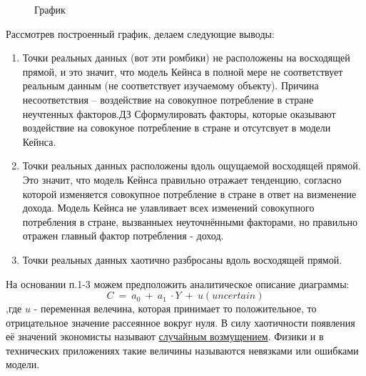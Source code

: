 \documentclass[12pt,a4paper]{article}
\begin{document}
\begin{figure}[H]
\begin{center}
\end{center}
\caption{График}
\end{figure}

Рассмотрев построенный график, делаем следующие выводы:
\begin{enumerate}
\item Точки реальных данных (вот эти ромбики) не расположены на восходящей прямой, и это значит, что модель Кейнса в полной мере не соответствует реальным данным (не соответствует изучаемому объекту). Причина несоответствия -- воздействие на совокупное потребление в стране неучтенных факторов.$\displaystyle \boxed{\text{ДЗ}}$ Сформулировать факторы, которые оказывают воздействие на совокуное потребление в стране и отсутсвует в модели Кейнса. 
\item Точки реальных данных расположены вдоль ощущаемой восходящей прямой. Это значит, что модель Кейнса правильно отражает тенденцию, согласно которой изменяется совокупное потребление в стране в ответ на визменение дохода. Модель Кейнса не улавливает всех изменений совокупного потребления в стране, вызванныех неуточнёнными факторами, но правильно отражен главный фактор потребления - доход.
\item Точки реальных данных хаотично разбросаны вдоль восходящей прямой.
\end{enumerate}

	На основании п.1-3 можем предположить аналитическое описание диаграммы:
\begin{equation}
C\ =\ a_{0} \ +\ a_{1} \ \cdot Y\ +\ u( uncertain)
\end{equation}
,где $\displaystyle u$ - переменная велечина, которая принимает то положительное, то отрицательное значение рассеянное вокруг нуля. В силу хаотичности появления её значений экономисты называют \underline{случайным возмущением}. Физики и в технических приложениях такие величины называются невязками или ошибками модели.
\end{document}
